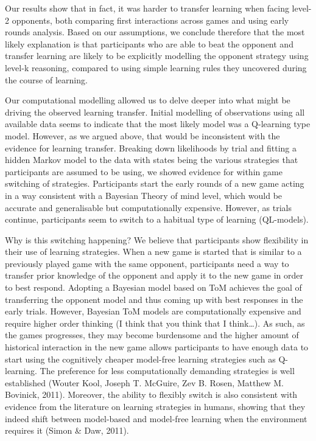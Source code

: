 \documentclass[man,floatsintext]{apa6}
\begin{document}
Our results show that in fact, it was harder to transfer learning when facing level-2 opponents, both comparing first interactions across games and using early rounds analysis. Based on our assumptions, we conclude therefore that the most likely explanation is that participants who are able to beat the opponent and transfer learning are likely to be explicitly modelling the opponent strategy using level-k reasoning, compared to using simple learning rules they uncovered during the course of learning.

Our computational modelling allowed us to delve deeper into what might be driving the observed learning transfer. Initial modelling of observations using all available data seems to indicate that the most likely model was a Q-learning type model. However, as we argued above, that would be inconsistent with the evidence for learning transfer. Breaking down likelihoods by trial and fitting a hidden Markov model to the data with states being the various strategies that participants are assumed to be using, we showed evidence for within game switching of strategies. Participants start the early rounds of a new game acting in a way consistent with a Bayesian Theory of mind level, which would be accurate and generalisable but computationally expensive. However, as trials continue, participants seem to switch to a habitual type of learning (QL-models).

Why is this switching happening? We believe that participants show flexibility in their use of learning strategies. When a new game is started that is similar to a previously played game with the same opponent, participants need a way to transfer prior knowledge of the opponent and apply it to the new game in order to best respond. Adopting a Bayesian model based on ToM achieves the goal of transferring the opponent model and thus coming up with best responses in the early trials. However, Bayesian ToM models are computationally expensive and require higher order thinking (I think that you think that I think\ldots{}). As such, as the games progresses, they may become burdensome and the higher amount of historical interaction in the new game allows participants to have enough data to start using the cognitively cheaper model-free learning strategies such as Q-learning. The preference for less computationally demanding strategies is well established (Wouter Kool, Joseph T. McGuire, Zev B. Rosen, Matthew M. Bovinick, 2011). Moreover, the ability to flexibly switch is also consistent with evidence from the literature on learning strategies in humans, showing that they indeed shift between model-based and model-free learning when the environment requires it (Simon \& Daw, 2011).
\end{document}
